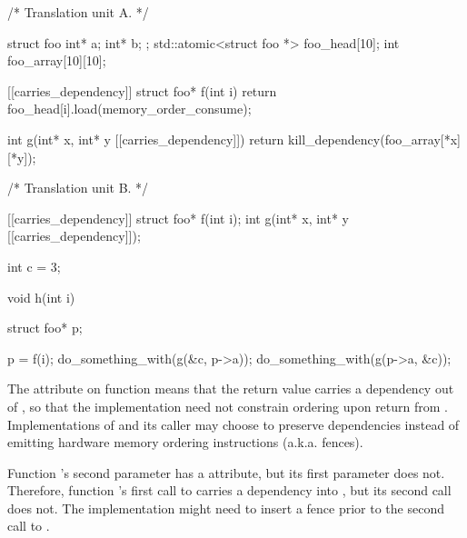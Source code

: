 \pnum
\enterexample
\begin{codeblock}
/* Translation unit A. */

struct foo { int* a; int* b; };
std::atomic<struct foo *> foo_head[10];
int foo_array[10][10];

[[carries_dependency]] struct foo* f(int i) {
  return foo_head[i].load(memory_order_consume);
}

int g(int* x, int* y [[carries_dependency]]) {
  return kill_dependency(foo_array[*x][*y]);
}

/* Translation unit B. */

[[carries_dependency]] struct foo* f(int i);
int g(int* x, int* y [[carries_dependency]]);

int c = 3;

void h(int i) {
  struct foo* p;

  p = f(i);
  do_something_with(g(&c, p->a));
  do_something_with(g(p->a, &c));
}
\end{codeblock}

\pnum
The  attribute on function  means that the
return value carries a dependency out of , so that the implementation
need not constrain ordering upon return from . Implementations of
 and its caller may choose to preserve dependencies instead of emitting
hardware memory ordering instructions (a.k.a. fences).

\pnum
Function 's second parameter has a  attribute,
but its first parameter does not. Therefore, function 's first call to
 carries a dependency into , but its second call does not. The
implementation might need to insert a fence prior to the second call to
.

\exitexample%
%
